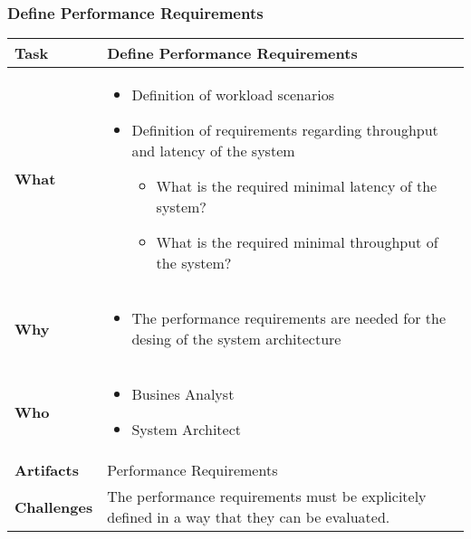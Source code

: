 \subsubsection{Define Performance Requirements}
\begin{tabularx}{\textwidth}{@{} l X @{}}
	\caption{Define Performance Requirements} \label{table:ch6_Task_Define_Performance Requirements}\\
	\toprule
	\bfseries Task & Define Performance Requirements\\
	\midrule\bfseries What & 
	\begin{itemize}
		\item Definition of workload scenarios
		\item Definition of requirements regarding throughput and latency of the system
		\begin{itemize}
			\item What is the required minimal latency of the system?
			\item What is the required minimal throughput of the system?
		\end{itemize}
	\end{itemize}
	\\
	\midrule
	\bfseries Why &
	\begin{itemize}
		\item The performance requirements are needed for the desing of the system architecture
	\end{itemize}\\
	\midrule
	\bfseries Who & 
	\begin{itemize}
		\item Busines Analyst
		\item System Architect
	\end{itemize}\\
	\midrule
	\bfseries Artifacts & Performance Requirements\\
	\midrule
	\bfseries Challenges & The performance requirements must be explicitely defined in a way that they can be evaluated.\\
	\bottomrule
\end{tabularx}

